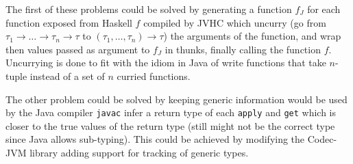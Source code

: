 \documentclass[float=false, crop=false]{standalone}
\begin{document}
The first of these problems could be solved by generating a function $f_J$ for each 
function exposed from Haskell $f$ compiled by JVHC which uncurry 
(go from \mbox{$\tau_1 \rightarrow \dotsc \rightarrow \tau_n \rightarrow \tau$} to
\mbox{$(\tau_1,\dotsc,\tau_n) \rightarrow \tau$}) the arguments of the function, and 
wrap then values passed as argument to $f_J$ in thunks, finally calling the function $f$. 
Uncurrying is done to fit with the idiom in Java of write functions that take 
$n$-tuple instead of a set of $n$ curried functions. 

The other problem could be solved by keeping generic information would be used by 
the Java compiler \texttt{javac} infer a return type of each \texttt{apply} and \texttt{get}
which is closer to the true values of the return type (still might not be the correct type 
since Java allows sub-typing). This could be achieved by modifying the Codec-JVM library 
\cite{codec-jvm-link} adding support for tracking of generic types.
\end{document}
